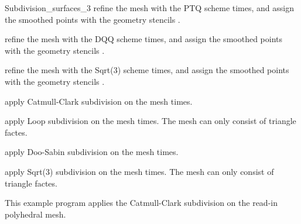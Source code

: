 \begin{ccRefClass}{Subdivision_surfaces_3}
{refine the mesh  with the PTQ scheme 
 times, and assign the smoothed points with the geometry 
stencils .}

{refine the mesh  with the DQQ scheme 
 times, and assign the smoothed points with the geometry 
stencils .}

{refine the mesh  with the Sqrt(3) scheme 
 times, and assign the smoothed points with the geometry 
stencils .}


\ccThree{}{}{}

{apply Catmull-Clark subdivision on the mesh   times.}

{apply Loop subdivision on the mesh   times. 
The mesh  can only consist of triangle factes.}

{apply Doo-Sabin subdivision on the mesh   times.}

{apply Sqrt(3) subdivision on the mesh   times.
The mesh  can only consist of triangle factes.}

\ccSeeAlso


\ccExample

This example program applies the Catmull-Clark subdivision on the
read-in polyhedral mesh.


\end{ccRefClass}

\ccRefPageEnd
